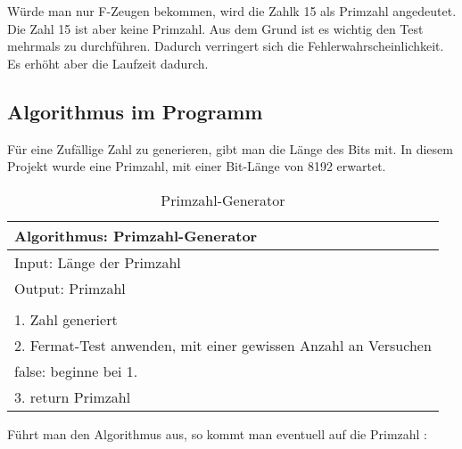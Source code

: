 Würde man nur F-Zeugen bekommen, wird die Zahlk 15 als Primzahl angedeutet. Die Zahl 15 ist aber keine Primzahl.
Aus dem Grund ist es wichtig den Test mehrmals zu durchführen. Dadurch verringert sich die Fehlerwahrscheinlichkeit. Es erhöht aber die Laufzeit dadurch.\\

\subsection*{Algorithmus im Programm}

Für eine Zufällige Zahl zu generieren, gibt man die Länge des Bits mit. In diesem Projekt wurde eine Primzahl, mit einer Bit-Länge von 8192 erwartet.

\begin{table}[!ht]
    \centering
        \begin{tabular}{l}
            \toprule
            \textbf{Algorithmus: Primzahl-Generator}\\
            \midrule
            Input: Länge der Primzahl\\
            Output: Primzahl  \\
            \\
            1. Zahl generiert\\
            2. Fermat-Test anwenden, mit einer gewissen Anzahl an Versuchen\\
                false: beginne bei 1. \\
            3. return Primzahl\\
           \bottomrule
        \end{tabular}
        \caption{Primzahl-Generator}
        \label{tab3}
    \end{table}

\newpage
Führt man den Algorithmus aus, so kommt man eventuell auf die Primzahl :

